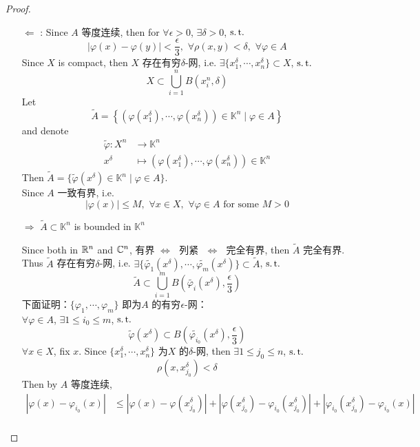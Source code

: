 \begin{thm}
\begin{proof}
\begin{enumerate}
				\item[$\Leftarrow$]: Since $A$ 等度连续, then for $\forall \epsilon > 0$, $\exists \delta > 0$, $\operatorname{s.t.}$
				\[ \left| \varphi(x) - \varphi(y) \right| < \frac{\epsilon}{3} , \,\, \forall \rho(x , y) < \delta , \,\, \forall \varphi \in A \]
				Since $X$ is compact, then $X$ 存在有穷$\delta$-网, i.e. $\exists \{ x_{1}^\delta , \cdots , x_{n}^\delta \} \subset X$, $\operatorname{s.t.}$
				\[ X \subset \bigcup_{i = 1}^{n} B(x_{i}^n , \delta) \]
				Let
				\[ \widetilde{A} = \left\{ \left( \varphi(x_{1}^\delta) , \cdots , \varphi(x_{n}^\delta) \right) \in \mathbb{K}^n \mid \varphi \in A \right\} \]
				and denote
				\begin{align}
					\widetilde{\varphi} : X^n &\longrightarrow \mathbb{K}^n \\
					x^\delta &\longmapsto \left( \varphi(x_{1}^\delta) , \cdots , \varphi(x_{n}^\delta) \right) \in \mathbb{K}^n
				\end{align}
				Then $\widetilde{A} = \{ \widetilde{\varphi}(x^\delta) \in \mathbb{K}^n \mid \varphi \in A \}$. \\
				Since $A$ 一致有界, i.e. 
				\[ \left| \varphi(x) \right| \leq M , \,\, \forall x \in X , \,\, \forall \varphi \in A \,\, \text{for some} \,\, M > 0 \]
				\begin{center}
					$\Rightarrow \,\, \widetilde{A} \subset \mathbb{K}^n$ is bounded in $\mathbb{K}^n$
				\end{center}
				Since both in $\mathbb{R}^n$ and $\mathbb{C}^n$, 有界$\,\, \Leftrightarrow \,\,$ 列紧 $\,\, \Leftrightarrow \,\,$ 完全有界, then $\widetilde{A}$ 完全有界. \\
				Thus $\widetilde{A}$ 存在有穷$\delta$-网, i.e. $\exists \{ \widetilde{\varphi_1}(x^\delta) , \cdots , \widetilde{\varphi_m}(x^\delta) \} \subset \widetilde{A}$, $\operatorname{s.t.}$
				\[ \widetilde{A} \subset \bigcup_{i = 1}^{m} B( \widetilde{\varphi_i}(x^\delta) , \frac{\epsilon}{3}) \]
				下面证明：$\{ \varphi_1 , \cdots , \varphi_m \}$ 即为$A$ 的有穷$\epsilon$-网：\\
				$\forall \varphi \in A$, $\exists 1 \leq i_0 \leq m$, $\operatorname{s.t.}$
				\[ \widetilde{\varphi}(x^\delta) \subset B( \widetilde{\varphi_{i_0}}(x^\delta) , \frac{\epsilon}{3}) \]
				$\forall x \in X$, fix $x$. Since $\{ x_{1}^\delta , \cdots , x_{n}^\delta \}$ 为$X$ 的$\delta$-网, then $\exists 1 \leq j_0 \leq n$, $\operatorname{s.t.}$
				\[ \rho(x , x_{j_0}^\delta) < \delta \]
				Then by $A$ 等度连续, 
				\begin{align}
					\left| \varphi(x) - \varphi_{i_0}(x) \right| 
					&\leq \left| \varphi(x) - \varphi(x_{j_0}^\delta) \right| + \left| \varphi(x_{j_0}^\delta) - \varphi_{i_0}(x_{j_0}^\delta) \right| + \left| \varphi_{i_0}(x_{j_0}^\delta) - \varphi_{i_0}(x) \right| \\

\end{align}
\end{enumerate}
\end{proof}
\end{thm}
